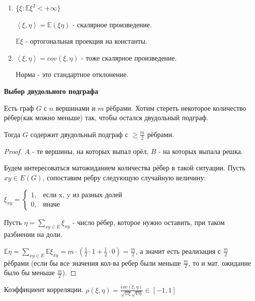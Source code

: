 \begin{remark}
    \begin{enumerate}
        \item {
            $\{ \xi : \mathbb{E} \xi^2 < +\infty \}$

            $\left <\xi, \eta \right > = \mathbb{E} (\xi \eta)$ - скалярное произведение.

            $\mathbb{E} \xi$ - ортогональная проекция на константы.
        }
        \item {
            $\left < \xi, \eta \right > = cov (\xi, \eta)$ - тоже скалярное произведение.

            Норма - это стандартное отклонение.
        }
    \end{enumerate}
\end{remark}

\begin{theorem}
    \textbf{Выбор двудольного подграфа}

    Есть граф $G$ с $n$ вершинами и $m$ рёбрами. Хотим стереть некоторое количество рёбер(как можно меньше) так, чтобы
    остался двудольный подграф.

    Тогда $G$ содержит двудольный подграф с $\geqslant \frac{m}{2}$ рёбрами.
\end{theorem}

\begin{proof}
    $A$ - те вершины, на которых выпал орёл, $B$ - на которых выпала решка.

    Будем интересоваться матожиданием количества рёбер в такой ситуации. Пусть $xy \in E(G)$, сопоставим ребру
    следующую случайную величину:

    $
    \xi_{xy} =
    \begin{cases}
        1, & \text{если x, y из разных долей} \\
        0, & \text{иначе}
    \end{cases}
    $

    Пусть $\eta = \sum_{xy \in E} \xi_{xy}$ - число рёбер, которое нужно оставить, при таком разбиении на доли.

    $\mathbb{E} \eta = \sum_{xy \in E} \mathbb{E} \xi_{xy} = m \cdot (\frac{1}{2} \cdot 1 + \frac{1}{2} \cdot 0) = \frac{m}{2}$, а значит есть реализация с $\frac{m}{2}$ рёбрами (если бы все значения кол-ва ребер были меньше $\frac{m}{2}$, то и мат. ожидание было бы меньше $\frac{m}{2}$).
\end{proof}

\begin{definition}
    Коэффициент корреляции. $\rho (\xi, \eta) = \frac{cov (\xi, \eta)}{\sqrt{\mathbb{D} \xi} \sqrt{\mathbb{D} \eta}} \in [-1, 1]$
\end{definition}

